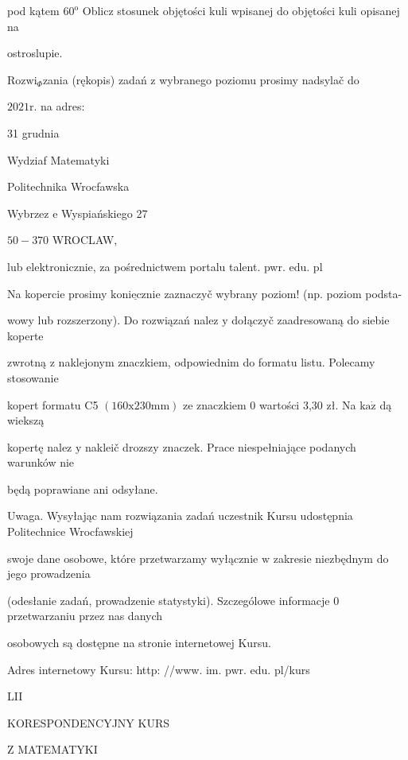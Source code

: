 \documentclass[a4paper,12pt]{article}
\begin{document}
pod kątem $60^{\mathrm{o}}$ Oblicz stosunek objętości kuli wpisanej do objętości kuli opisanej na

ostroslupie.

$\mathrm{R}\mathrm{o}\mathrm{z}\mathrm{w}\mathrm{i}_{\Phi}$zania (rękopis) zadań $\mathrm{z}$ wybranego poziomu prosimy nadsylač do

$2021\mathrm{r}$. na adres:

31 grudnia

Wydziaf Matematyki

Politechnika Wrocfawska

Wybrzez $\mathrm{e}$ Wyspiańskiego 27

$50-370$ WROCLAW,

lub elektronicznie, za pośrednictwem portalu talent. pwr. edu. pl

Na kopercie prosimy $\underline{\mathrm{k}\mathrm{o}\mathrm{n}\mathrm{i}\mathrm{e}\mathrm{c}\mathrm{z}\mathrm{n}\mathrm{i}\mathrm{e}}$ zaznaczyč wybrany poziom! (np. poziom podsta-

wowy lub rozszerzony). Do rozwiązań nalez $\mathrm{y}$ dołączyč zaadresowaną do siebie koperte

zwrotną $\mathrm{z}$ naklejonym znaczkiem, odpowiednim do formatu listu. Polecamy stosowanie

kopert formatu C5 $(160\mathrm{x}230\mathrm{m}\mathrm{m})$ ze znaczkiem $0$ wartości 3,30 zł. Na $\mathrm{k}\mathrm{a}\dot{\mathrm{z}}$ dą wiekszą

kopertę nalez $\mathrm{y}$ nakleič drozszy znaczek. Prace niespełniające podanych warunków nie

będą poprawiane ani odsyłane.

Uwaga. Wysyłając nam rozwiązania zadań uczestnik Kursu udostępnia Politechnice Wrocfawskiej

swoje dane osobowe, które przetwarzamy wyłącznie $\mathrm{w}$ zakresie niezbędnym do jego prowadzenia

(odesłanie zadań, prowadzenie statystyki). Szczególowe informacje $0$ przetwarzaniu przez nas danych

osobowych są dostępne na stronie internetowej Kursu.

Adres internetowy Kursu: http: //www. im. pwr. edu. pl/kurs







LII

KORESPONDENCYJNY KURS

Z MATEMATYKI
\end{document}
